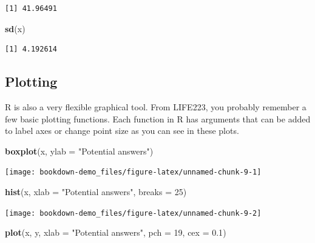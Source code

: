 \documentclass[
]{book}
\newenvironment{Shaded}{\begin{snugshade}}{\end{snugshade}}
\newcommand{\DataTypeTok}[1]{\textcolor[rgb]{0.13,0.29,0.53}{#1}}
\newcommand{\DecValTok}[1]{\textcolor[rgb]{0.00,0.00,0.81}{#1}}
\newcommand{\FloatTok}[1]{\textcolor[rgb]{0.00,0.00,0.81}{#1}}
\newcommand{\KeywordTok}[1]{\textcolor[rgb]{0.13,0.29,0.53}{\textbf{#1}}}
\newcommand{\NormalTok}[1]{#1}
\newcommand{\StringTok}[1]{\textcolor[rgb]{0.31,0.60,0.02}{#1}}
\begin{document}
\begin{verbatim}
[1] 41.96491
\end{verbatim}

\begin{Shaded}
\begin{Highlighting}[]
\KeywordTok{sd}\NormalTok{(x)}
\end{Highlighting}
\end{Shaded}

\begin{verbatim}
[1] 4.192614
\end{verbatim}

\hypertarget{plotting}{%
\subsection{Plotting}\label{plotting}}

R is also a very flexible graphical tool. From LIFE223, you probably remember a few basic plotting functions. Each function in R has arguments that can be added to label axes or change point size as you can see in these plots.

\begin{Shaded}
\begin{Highlighting}[]
\KeywordTok{boxplot}\NormalTok{(x, }\DataTypeTok{ylab =} \StringTok{"Potential answers"}\NormalTok{)}
\end{Highlighting}
\end{Shaded}

\begin{center}\texttt{[image: bookdown-demo\_files/figure-latex/unnamed-chunk-9-1]} \end{center}

\begin{Shaded}
\begin{Highlighting}[]
\KeywordTok{hist}\NormalTok{(x, }\DataTypeTok{xlab =} \StringTok{"Potential answers"}\NormalTok{, }\DataTypeTok{breaks =} \DecValTok{25}\NormalTok{)}
\end{Highlighting}
\end{Shaded}

\begin{center}\texttt{[image: bookdown-demo\_files/figure-latex/unnamed-chunk-9-2]} \end{center}

\begin{Shaded}
\begin{Highlighting}[]
\KeywordTok{plot}\NormalTok{(x, y, }\DataTypeTok{xlab =} \StringTok{"Potential answers"}\NormalTok{, }\DataTypeTok{pch =} \DecValTok{19}\NormalTok{, }\DataTypeTok{cex =} \FloatTok{0.1}\NormalTok{)}
\end{Highlighting}
\end{Shaded}
\end{document}

